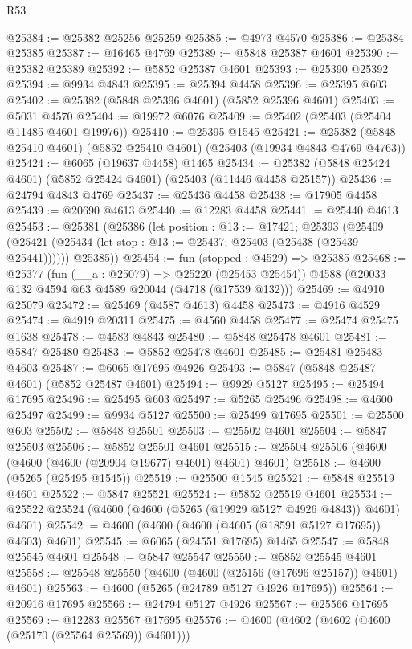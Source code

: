 \begin{lexlean}{R53}
\begin{coremodule}
@25384 := @25382 @25256 @25259
@25385 := @4973 @4570
@25386 := @25384 @25385
@25387 := @16465 @4769
@25389 := @5848 @25387 @4601
@25390 := @25382 @25389
@25392 := @5852 @25387 @4601
@25393 := @25390 @25392
@25394 := @9934 @4843
@25395 := @25394 @4458
@25396 := @25395 @603
@25402 := @25382 (@5848 @25396 @4601) (@5852 @25396 @4601)
@25403 := @5031 @4570
@25404 := @19972 @6076
@25409 := @25402 (@25403 (@25404 @11485 @4601 @19976))
@25410 := @25395 @1545
@25421 := @25382 (@5848 @25410 @4601) (@5852 @25410 @4601) (@25403 (@19934 @4843 @4769 @4763))
@25424 := @6065 (@19637 @4458) @1465
@25434 := @25382 (@5848 @25424 @4601) (@5852 @25424 @4601) (@25403 (@11446 @4458 @25157))
@25436 := @24794 @4843 @4769
@25437 := @25436 @4458
@25438 := @17905 @4458
@25439 := @20690 @4613
@25440 := @12283 @4458
@25441 := @25440 @4613
@25453 := @25381
    (@25386
      (let position : @13 := @17421;
      @25393
        (@25409 (@25421 (@25434 (let stop : @13 := @25437; @25403 (@25438 (@25439 @25441))))))
        @25385))
@25454 := fun (stopped : @4529) => @25385
@25468 := @25377
    (fun (__a : @25079) => @25220 (@25453 @25454))
    @4588
    (@20033 @132 @4594 @63 @4589 @20044 (@4718 (@17539 @132)))
@25469 := @4910 @25079
@25472 := @25469 (@4587 @4613) @4458
@25473 := @4916 @4529
@25474 := @4919 @20311
@25475 := @4560 @4458
@25477 := @25474 @25475 @1638
@25478 := @4583 @4843
@25480 := @5848 @25478 @4601
@25481 := @5847 @25480
@25483 := @5852 @25478 @4601
@25485 := @25481 @25483 @4603
@25487 := @6065 @17695 @4926
@25493 := @5847 (@5848 @25487 @4601) (@5852 @25487 @4601)
@25494 := @9929 @5127
@25495 := @25494 @17695
@25496 := @25495 @603
@25497 := @5265 @25496
@25498 := @4600 @25497
@25499 := @9934 @5127
@25500 := @25499 @17695
@25501 := @25500 @603
@25502 := @5848 @25501
@25503 := @25502 @4601
@25504 := @5847 @25503
@25506 := @5852 @25501 @4601
@25515 := @25504 @25506 (@4600 (@4600 (@4600 (@20904 @19677) @4601) @4601) @4601)
@25518 := @4600 (@5265 (@25495 @1545))
@25519 := @25500 @1545
@25521 := @5848 @25519 @4601
@25522 := @5847 @25521
@25524 := @5852 @25519 @4601
@25534 := @25522 @25524 (@4600 (@4600 (@5265 (@19929 @5127 @4926 @4843)) @4601) @4601)
@25542 := @4600 (@4600 (@4600 (@4605 (@18591 @5127 @17695)) @4603) @4601)
@25545 := @6065 (@24551 @17695) @1465
@25547 := @5848 @25545 @4601
@25548 := @5847 @25547
@25550 := @5852 @25545 @4601
@25558 := @25548 @25550 (@4600 (@4600 (@25156 (@17696 @25157)) @4601) @4601)
@25563 := @4600 (@5265 (@24789 @5127 @4926 @17695))
@25564 := @20916 @17695
@25566 := @24794 @5127 @4926
@25567 := @25566 @17695
@25569 := @12283 @25567 @17695
@25576 := @4600 (@4602 (@4602 (@4600 (@25170 (@25564 @25569)) @4601)))

\end{coremodule}
\end{lexlean}
